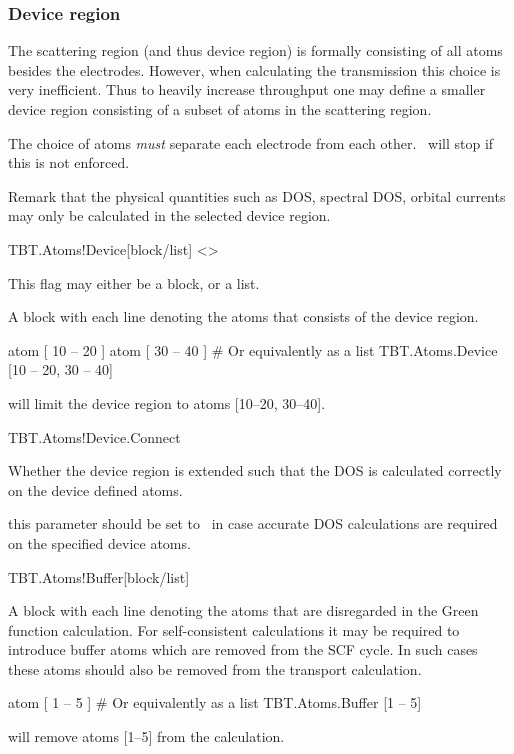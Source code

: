 \subsubsection{Device region} 

The scattering region (and thus device region) is formally consisting
of all atoms besides the electrodes. However, when calculating the
transmission this choice is very inefficient. Thus to heavily increase
throughput one may define a smaller device region consisting of a
subset of atoms in the scattering region.

The choice of atoms \emph{must} separate each electrode from each
other. \tbtrans\ will stop if this is not enforced.

Remark that the physical quantities such as DOS, spectral DOS, orbital
currents may only be calculated in the selected device region. 

\begin{fdfentry}{TBT.Atoms!Device}[block/list]%
  <>

  This flag may either be a block, or a list.

  A block with each line denoting the atoms that consists of the
  device region.
  \begin{fdfexample}
       atom [ 10 -- 20 ]
       atom [ 30 -- 40 ]
    # Or equivalently as a list   
    TBT.Atoms.Device [10 -- 20, 30 -- 40]
  \end{fdfexample}
  will limit the device region to atoms [10--20, 30--40].
  
\end{fdfentry}

\begin{fdflogicalF}{TBT.Atoms!Device.Connect}
  
  Whether the device region is extended such that the DOS is
  calculated correctly on the device defined atoms.

  \note this parameter should be set to \fdftrue\ in case accurate DOS
  calculations are required on the specified device atoms. 

\end{fdflogicalF}

\begin{fdfentry}{TBT.Atoms!Buffer}[block/list]%

  A block with each line denoting the atoms that are disregarded in
  the Green function calculation.
  For self-consistent calculations it may be required to introduce
  buffer atoms which are removed from the SCF cycle. In such cases
  these atoms should also be removed from the transport calculation.
  \begin{fdfexample}
       atom [ 1 -- 5 ]
    # Or equivalently as a list   
    TBT.Atoms.Buffer [1 -- 5]
  \end{fdfexample}
  will remove atoms [1--5] from the calculation.
  
\end{fdfentry}


